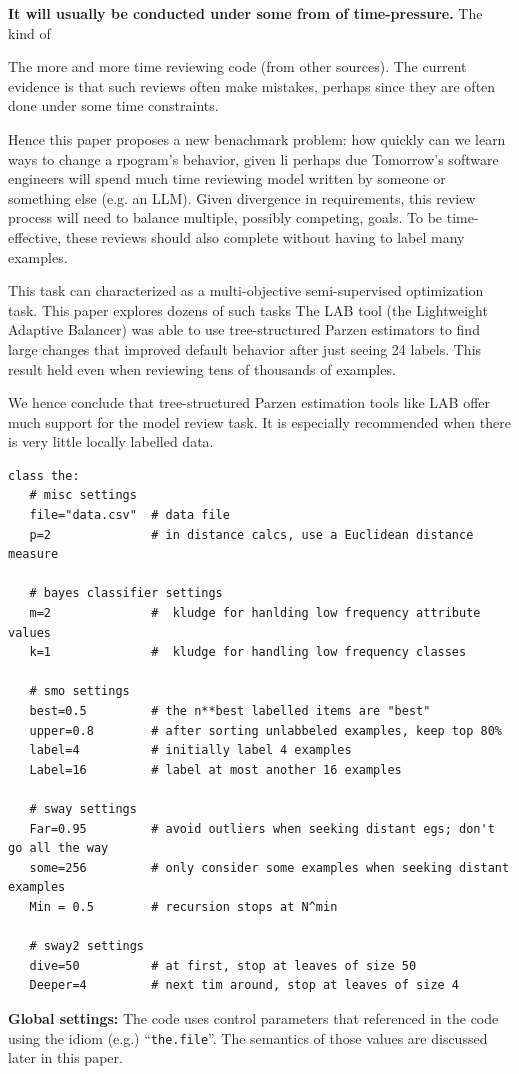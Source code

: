 {\bf It will usually be conducted under some from of time-pressure.}
The kind of 



The more and more time reviewing code (from other sources).
The current evidence is that such reviews often make mistakes,
perhaps since they are often done under some time constraints.

Hence this paper proposes a new benachmark problem: how quickly can we learn ways to change a rpogram's behavior, given li
perhaps due 
Tomorrow's software engineers will spend much time reviewing  model written by someone or something else (e.g. an LLM).  
Given   divergence in   requirements, this review  process  will need 
 to balance   multiple, possibly competing, goals. To be time-effective, these reviews should also  complete without having to label many examples.
 
This task can  characterized  as a   multi-objective  semi-supervised optimization task.   This paper explores
 dozens of such tasks  
The LAB tool
(the Lightweight Adaptive Balancer) 
  was able to use tree-structured Parzen estimators to find large changes that improved
  default behavior  after just seeing 24 labels.
  This result held even when reviewing tens of thousands of examples.  
  
  We hence conclude that tree-structured Parzen estimation
  tools like LAB offer much support for the model  review task. It is especially recommended when there is very little locally labelled data. 
 

 \begin{listing} 
\begin{verbatim}
class the:  
   # misc settings
   file="data.csv"  # data file
   p=2              # in distance calcs, use a Euclidean distance measure 
   
   # bayes classifier settings
   m=2              #  kludge for hanlding low frequency attribute values
   k=1              #  kludge for handling low frequency classes
   
   # smo settings
   best=0.5         # the n**best labelled items are "best"
   upper=0.8        # after sorting unlabbeled examples, keep top 80%
   label=4          # initially label 4 examples
   Label=16         # label at most another 16 examples

   # sway settings
   Far=0.95         # avoid outliers when seeking distant egs; don't go all the way
   some=256         # only consider some examples when seeking distant examples 
   Min = 0.5        # recursion stops at N^min

   # sway2 settings
   dive=50          # at first, stop at leaves of size 50
   Deeper=4         # next tim around, stop at leaves of size 4
\end{verbatim}
\caption{{\bf Global settings:} The code uses    control parameters  that referenced in the code using
the idiom (e.g.) ``\texttt{the.file}''.  The semantics of those values are discussed later in this paper.}
\label{listing:the}
\end{listing} 

